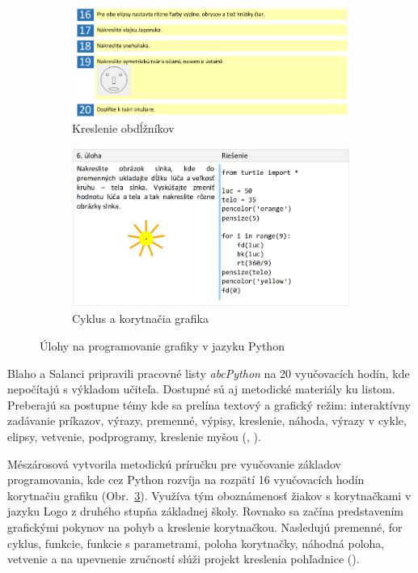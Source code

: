 \begin{figure}[h]
\centering
\begin{subfigure}[b]{0.55\textwidth}
\centering
\includegraphics[width=\textwidth]{assets/kucera-python.png}
\caption{Kreslenie obdĺžníkov}
\label{fig:kucera-kreslenie-python}
\end{subfigure}
\begin{subfigure}[b]{0.44\textwidth}
\centering
\includegraphics[width=\textwidth]{assets/uloha-turtle.png}
\caption{Cyklus a korytnačia grafika}
\label{fig:turtle-graphics}
\end{subfigure}
\caption{Úlohy na programovanie grafiky v jazyku Python}
\end{figure}

Blaho a Salanci pripravili pracovné listy \emph{abcPython} na 20 vyučovacích hodín, kde nepočítajú s výkladom učiteľa. Dostupné sú aj metodické materiály ku listom. Preberajú sa postupne témy kde sa prelína textový a grafický režim: interaktívny zadávanie príkazov, výrazy, premenné, výpisy, kreslenie, náhoda, výrazy v cykle, elipsy, vetvenie, podprogramy, kreslenie myšou (\cite{blaho_abcpython_2019}, \cite{blaho_metodiky_2019}). 

Mészárosová vytvorila metodickú príručku pre vyučovanie základov programovania, kde cez Python rozvíja na rozpätí 16 vyučovacích hodín korytnačiu grafiku (Obr.~\ref{fig:turtle-graphics}). Využíva tým oboznámenosť žiakov s korytnačkami v jazyku Logo z druhého stupňa základnej školy. Rovnako sa začína predstavením grafickými pokynov na pohyb a kreslenie korytnačkou. Nasledujú premenné, for cyklus, funkcie, funkcie s parametrami, poloha korytnačky, náhodná poloha, vetvenie a na upevnenie zručností slúži projekt kreslenia pohľadnice (\cite{meszarosova_python_2017}).


